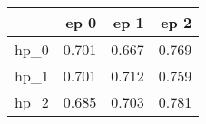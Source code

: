 \begin{tabular}{lrrr}
\toprule
{} &   ep 0 &   ep 1 &   ep 2 \\
\midrule
hp\_0 &  0.701 &  0.667 &  0.769 \\
hp\_1 &  0.701 &  0.712 &  0.759 \\
hp\_2 &  0.685 &  0.703 &  0.781 \\
\bottomrule
\end{tabular}
